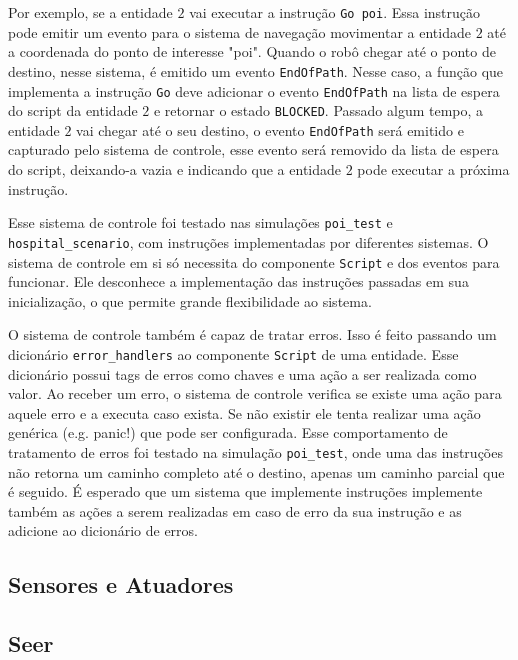 Por exemplo, se a entidade $2$ vai executar a instrução \texttt{Go poi}. Essa instrução pode emitir um evento para o sistema de navegação movimentar a entidade $2$ até a coordenada do ponto de interesse "poi". Quando o robô chegar até o ponto de destino, nesse sistema, é emitido um evento \texttt{EndOfPath}. Nesse caso, a função que implementa a instrução \texttt{Go} deve adicionar o evento \texttt{EndOfPath} na lista de espera do script da entidade $2$ e retornar o estado \texttt{BLOCKED}. Passado algum tempo, a entidade $2$ vai chegar até o seu destino, o evento \texttt{EndOfPath} será emitido e capturado pelo sistema de controle, esse evento será removido da lista de espera do script, deixando-a vazia e indicando que a entidade $2$ pode executar a próxima instrução.

Esse sistema de controle foi testado nas simulações \texttt{poi\_test} e \texttt{hospital\_scenario}, com instruções implementadas por diferentes sistemas. O sistema de controle em si só necessita do componente \texttt{Script} e dos eventos para funcionar. Ele desconhece a implementação das instruções passadas em sua inicialização, o que permite grande flexibilidade ao sistema.

O sistema de controle também é capaz de tratar erros. Isso é feito passando um dicionário \texttt{error\_handlers} ao componente \texttt{Script} de uma entidade. Esse dicionário possui tags de erros como chaves e uma ação a ser realizada como valor. Ao receber um erro, o sistema de controle verifica se existe uma ação para aquele erro e a executa caso exista. Se não existir ele tenta realizar uma ação genérica (e.g. panic!) que pode ser configurada. Esse comportamento de tratamento de erros foi testado na simulação \texttt{poi\_test}, onde uma das instruções não retorna um caminho completo até o destino, apenas um caminho parcial que é seguido. É esperado que um sistema que implemente instruções implemente também as ações a serem realizadas em caso de erro da sua instrução e as adicione ao dicionário de erros.

\subsection{Sensores e Atuadores}
\label{sec:robot_skills}

\subsection{Seer}
\label{sec:seer}

